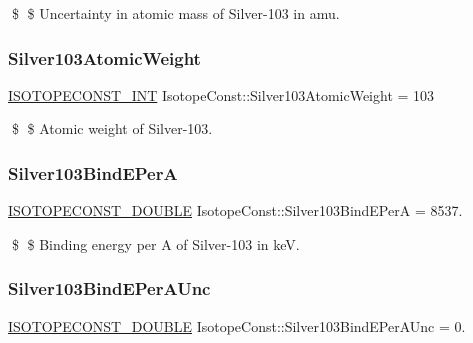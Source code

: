 \$ \$ Uncertainty in atomic mass of Silver-\/103 in amu. \mbox{\label{group___isotope_const-_silver-_ag103_gabd46e3aae2962c272d99d4e2161e0dcf}} 
\subsubsection{\texorpdfstring{Silver103\+Atomic\+Weight}{Silver103AtomicWeight}}
{\footnotesize\ttfamily \mbox{\hyperlink{group___isotope_const-_macros_ga5f18360b3e99483a35c32d789e62621c}{I\+S\+O\+T\+O\+P\+E\+C\+O\+N\+S\+T\+\_\+\+I\+NT}} Isotope\+Const\+::\+Silver103\+Atomic\+Weight = 103}

\$ \$ Atomic weight of Silver-\/103. \mbox{\label{group___isotope_const-_silver-_ag103_ga8a5eccbeb32da677bb232882e626e744}} 
\subsubsection{\texorpdfstring{Silver103\+Bind\+E\+PerA}{Silver103BindEPerA}}
{\footnotesize\ttfamily \mbox{\hyperlink{group___isotope_const-_macros_ga8f45a7272ce02c0b4c65c44636ed719a}{I\+S\+O\+T\+O\+P\+E\+C\+O\+N\+S\+T\+\_\+\+D\+O\+U\+B\+LE}} Isotope\+Const\+::\+Silver103\+Bind\+E\+PerA = 8537.}

\$ \$ Binding energy per A of Silver-\/103 in keV. \mbox{\label{group___isotope_const-_silver-_ag103_gafbe1f10b934287b27356163eed8e91a5}} 
\subsubsection{\texorpdfstring{Silver103\+Bind\+E\+Per\+A\+Unc}{Silver103BindEPerAUnc}}
{\footnotesize\ttfamily \mbox{\hyperlink{group___isotope_const-_macros_ga8f45a7272ce02c0b4c65c44636ed719a}{I\+S\+O\+T\+O\+P\+E\+C\+O\+N\+S\+T\+\_\+\+D\+O\+U\+B\+LE}} Isotope\+Const\+::\+Silver103\+Bind\+E\+Per\+A\+Unc = 0.}

